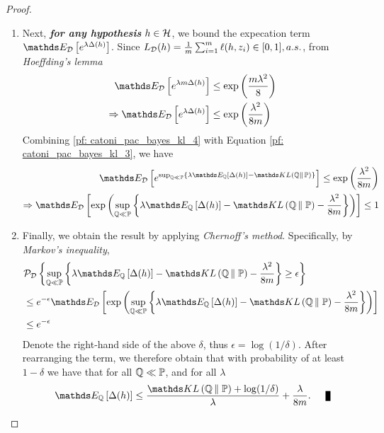 \documentclass[11pt]{article}
\begin{document}
\begin{itemize}
\begin{proof}
\begin{enumerate}
\item Next, \emph{\textbf{for any hypothesis}} $h\in {\mathcal H}$, we bound the expecation term $\E{\cD}{e^{\lambda \Delta(h)}}$. Since $L_{{\mathcal D}}(h) = \frac{1}{m}\sum_{i=1}^{m}\ell(h, z_i) \in [0,1], a.s.$,  from \emph{Hoeffding's lemma}  
\begin{align}
\E{\cD}{e^{\lambda m \Delta(h)}} &\le \exp\paren{\frac{ m \lambda^2 }{8}} \nonumber\\
\Rightarrow \E{\cD}{e^{\lambda  \Delta(h)}} &\le \exp\paren{\frac{\lambda^2}{8m}} \label{pf: catoni_pac_bayes_kl_4}
\end{align} Combining \eqref{pf: catoni_pac_bayes_kl_4} with Equation \eqref{pf: catoni_pac_bayes_kl_3}, we have
\begin{align}
\E{\cD}{e^{\sup_{\bQ \ll \bP}\set{\lambda\E{\bQ}{\Delta(h)} - \kl{\bQ}{\bP}  }}}  \le  \exp\paren{\frac{\lambda^2 }{8m}} \nonumber\\
\Rightarrow \E{\cD}{\exp\paren{\sup_{\bQ \ll \bP}\set{\lambda\E{\bQ}{\Delta(h)} - \kl{\bQ}{\bP} - \frac{\lambda^2 }{8m}  }}} \le 1  \label{pf: catoni_pac_bayes_kl_5}
\end{align}

\item  Finally, we  obtain the result by applying \emph{Chernoff's method}. Specifically, by \emph{Markov's inequality}, 
\begin{align}
&\cP_{\cD}\set{\sup_{\bQ \ll \bP}\set{\lambda  \E{\bQ}{\Delta(h)}  - \kl{\bQ}{\bP} - \frac{\lambda^2 }{8m}  } \ge \epsilon} \nonumber\\
&\le e^{-\epsilon}\E{\cD}{\exp\paren{\sup_{\bQ \ll \bP}\set{\lambda\E{\bQ}{\Delta(h)} - \kl{\bQ}{\bP} - \frac{\lambda^2 }{8m}  }}} \nonumber\\
&\le e^{-\epsilon}  \label{pf: catoni_pac_bayes_kl_6}
\end{align} Denote the right-hand side of the above $\delta$, thus $\epsilon = \log(1/\delta)$. After rearranging the term, we therefore obtain that with probability of at least $1 - \delta$ we have that for all ${\mathbb Q} \ll {\mathbb P}$, and for all $\lambda$
\begin{align*}
 \E{\bQ}{\Delta(h)} \le \frac{\kl{\bQ}{\bP}  + \log(1/\delta) }{\lambda} +  \frac{\lambda }{8m}. \qed
\end{align*} 
\end{enumerate}
\end{proof}


\end{itemize}
\end{document}
